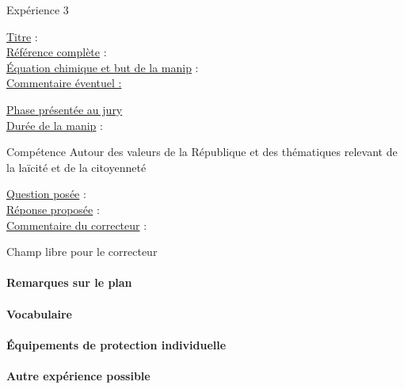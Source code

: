 \begin{reportBlock}{Expérience 3}

\underline{Titre} : \\

\underline{Référence complète} : \\ 

\underline{Équation chimique et but de la manip} :  \\


\underline{Commentaire éventuel :} 

\underline{Phase présentée au jury} \\

\underline{Durée de la manip} :  \\

\end{reportBlock}



\begin{reportBlock}{Compétence \og Autour des valeurs de la République et des thématiques relevant de la laïcité et de la citoyenneté \fg{}}

\underline{Question posée} : \\

\underline{Réponse proposée} : \\ 

\underline{Commentaire du correcteur} : \\

\end{reportBlock}


\begin{reportBlock}{Champ libre pour le correcteur}

\paragraph*{Remarques sur le plan}


\paragraph*{Vocabulaire}

\paragraph*{Équipements de protection individuelle}

\paragraph*{Autre expérience possible} 

\end{reportBlock}